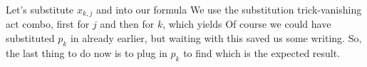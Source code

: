 Let's substitute $x_{k,j}$ and into our formula 
We use the substitution trick-vanishing act combo, first for $j$ and then for $k$, which yields
Of course we could have substituted $p_k$ in already earlier, but waiting with this saved us some writing. So, the last thing to do now is to plug in $p_k$ to find
which is the expected result. 
